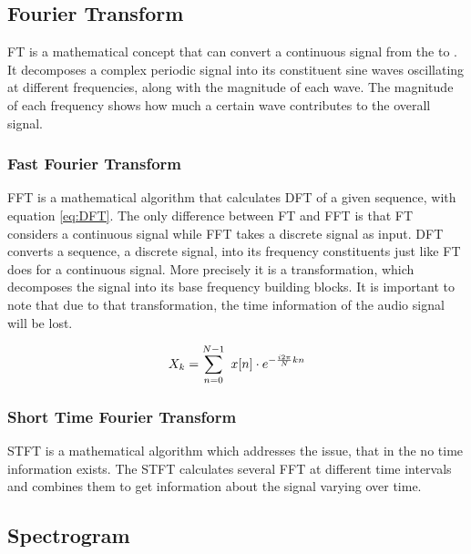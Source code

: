 \subsection{Fourier Transform}
\label{sub:Fourier-Transform}

\gls{FT} is a mathematical concept that can convert a continuous signal from the  to . It decomposes a complex periodic signal into its constituent sine waves oscillating at different frequencies, along with the magnitude of each wave. The magnitude of each frequency shows how much a certain wave contributes to the overall signal.

\subsubsection{Fast Fourier Transform}
\label{subsub:Fast-Fourier-Transform}

\gls{FFT} is a mathematical algorithm that calculates \gls{DFT} of a given sequence, with equation \ref{eq:DFT}. The only difference between \gls{FT} and \gls{FFT} is that \gls{FT} considers a continuous signal while \gls{FFT} takes a discrete signal as input. \gls{DFT} converts a sequence, a discrete signal, into its frequency constituents just like \gls{FT} does for a continuous signal. More precisely it is a transformation, which decomposes the signal into its base frequency building blocks. It is important to note that due to that transformation, the time information of the audio signal will be lost.

\begin{equation}
    \centering
    X_k = \sum_{n=0}^{N-1} \ x[n] \cdot e^{-\frac{i2\pi}{N}kn}
    \label{eq:DFT}
\end{equation}

\subsubsection{Short Time Fourier Transform}
\label{subsub:Short-Time-Fourier-Transform}

\gls{STFT} is a mathematical algorithm which addresses the issue, that in the  no time information exists. The \gls{STFT} calculates several \gls{FFT} at different time intervals and combines them to get information about the signal varying over time.

\subsection{Spectrogram}
\label{sub:Spectrogram}

